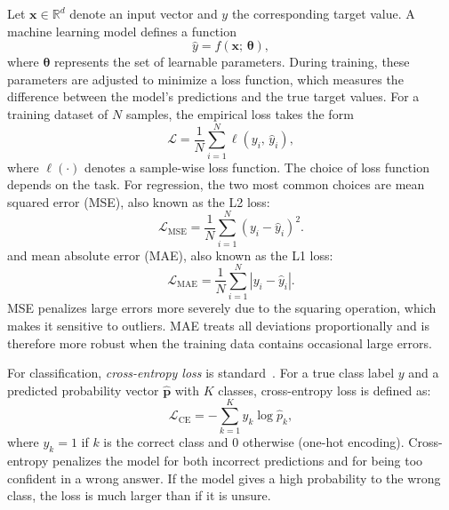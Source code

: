 Let $\mathbf{x} \in \mathbb{R}^d$ denote an input vector and $y$ the corresponding target value. A machine learning model defines a function
\begin{equation}
  \hat{y} = f(\mathbf{x};\, \boldsymbol{\theta}),
\end{equation}
where $\boldsymbol{\theta}$ represents the set of learnable parameters. During training, these parameters are adjusted to minimize a loss function, which measures the difference between the model's predictions and the true target values. For a training dataset of $N$ samples, the empirical loss takes the form
\begin{equation}
  \mathcal{L} = \frac{1}{N} \sum_{i=1}^{N} \ell\!\left(y_i,\, \hat{y}_i\right),
\end{equation}
where $\ell(\cdot)$ denotes a sample-wise loss function. The choice of loss function depends on the task. For regression, the two most common choices are mean squared error (MSE), also known as the L2 loss:
\begin{equation}
    \mathcal{L}_{\text{MSE}} = \frac{1}{N}\sum_{i=1}^{N}(y_i - \hat{y}_i)^2.
    \label{eq:mse}
\end{equation}
and mean absolute error (MAE), also known as the L1 loss:
\begin{equation}
    \mathcal{L}_{\text{MAE}} = \frac{1}{N}\sum_{i=1}^{N}|y_i - \hat{y}_i|.
    \label{eq:mae}
\end{equation}
MSE penalizes large errors more severely due to the squaring operation, which makes it sensitive to outliers. MAE treats all deviations proportionally and is therefore more robust when the training data contains occasional large errors. 

For classification, \emph{cross-entropy loss} is standard~\cite{bishop2006prml}. For a true class label $y$ and a predicted probability vector $\hat{\mathbf{p}}$ with $K$ classes, cross-entropy loss is defined as:
\begin{equation}
  \mathcal{L}_{\mathrm{CE}} = -\sum_{k=1}^{K} y_k \log \hat{p}_k,
\end{equation}
where $y_k = 1$ if $k$ is the correct class and $0$ otherwise (one-hot encoding). Cross-entropy penalizes the model for both incorrect predictions and for being too confident in a wrong answer. If the model gives a high probability to the wrong class, the loss is much larger than if it is unsure.

